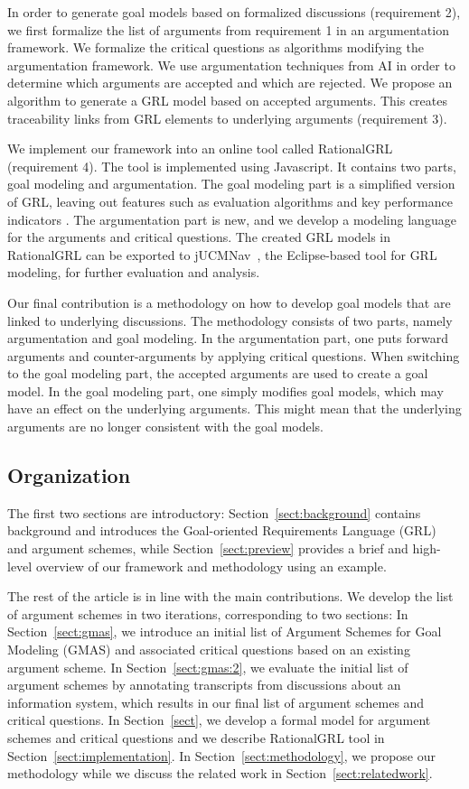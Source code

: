 In order to generate goal models based on formalized discussions (requirement 2), we first formalize the list of arguments from requirement 1 in an argumentation framework. We formalize the critical questions as algorithms modifying the argumentation framework. We use argumentation techniques from AI in order to determine which arguments are accepted and which are rejected. We propose an algorithm to generate a GRL model based on accepted arguments. This creates traceability links from GRL elements to underlying arguments (requirement 3).

We implement our framework into an online tool called RationalGRL (requirement 4). The tool is implemented using Javascript. It contains  two parts, goal modeling and argumentation. The goal modeling part is a simplified version of GRL, leaving out features such as evaluation algorithms and key performance indicators . The argumentation part is new, and we develop a modeling language for the arguments and critical questions. The created GRL models in RationalGRL can be exported to jUCMNav~\cite{}, the Eclipse-based tool for GRL modeling, for further evaluation and  analysis. 

Our final contribution is a methodology on how to develop goal models that are linked to underlying discussions. The methodology consists of two parts, namely argumentation and goal modeling. In the argumentation part, one puts forward arguments and counter-arguments by applying critical questions. When switching to the goal modeling part, the accepted arguments are used to create a goal model. In the goal modeling part, one simply modifies goal models, which may have an effect on the underlying arguments. This might mean that the underlying arguments are no longer consistent with the goal models.

\subsection{Organization}

The first two sections are introductory: Section~\ref{sect:background} contains background and introduces the Goal-oriented Requirements Language (GRL)~\cite{} and argument schemes, while Section~\ref{sect:preview} provides a brief and high-level overview of our framework and methodology using an example. 

The rest of the article is in line with the main contributions. We develop the list of argument schemes in two iterations, corresponding to two sections: In Section~\ref{sect:gmas}, we introduce an initial list of Argument Schemes for Goal Modeling (GMAS) and associated critical questions based on an existing argument scheme. In Section~\ref{sect:gmas:2}, we evaluate the initial list of argument schemes by annotating transcripts from discussions about an information system, which results in our final list of argument schemes and critical questions. In Section~\ref{sect}, we develop a formal model for argument schemes and critical questions and we describe RationalGRL tool in Section~\ref{sect:implementation}. In Section~\ref{sect:methodology}, we propose our methodology while we discuss the related work in Section~\ref{sect:relatedwork}.